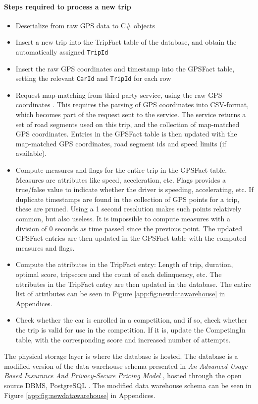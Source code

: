 \paragraph{Steps required to process a new trip}
\begin{itemize}
\item Deserialize from raw GPS data to C\# objects
\item Insert a new trip into the TripFact table of the database, and obtain the automatically assigned \texttt{TripId}
\item Insert the raw GPS coordinates and timestamp into the GPSFact table, setting the relevant \texttt{CarId} and \texttt{TripId} for each row
\item Request map-matching from third party service, using the raw GPS coordinates \cite{trackmatch}. This requires the parsing of GPS coordinates into CSV-format, which becomes part of the request sent to the service. The service returns a set of road segments used on this trip, and the collection of map-matched GPS coordinates. Entries in the GPSFact table is then updated with the map-matched GPS coordinates, road segment ids and speed limits (if available).
\item Compute measures and flags for the entire trip in the GPSFact table. Measures are attributes like speed, acceleration, etc. Flags provides a true/false value to indicate whether the driver is speeding,  accelerating, etc. If duplicate timestamps are found in the collection of GPS points for a trip, these are pruned. Using a 1 second resolution makes such points relatively common, but also useless. It is impossible to compute measures with a division of 0 seconds as time passed since the previous point. The updated GPSFact entries are then updated in the GPSFact table with the computed measures and flags.
\item Compute the attributes in the TripFact entry: Length of trip, duration, optimal score, tripscore and the count of each delinquency, etc. The attributes in the TripFact entry are then updated in the database. The entire list of attributes can be seen in Figure \ref{app:fig:newdatawarehouse} in Appendices.
\item Check whether the car is enrolled in a competition, and if so, check whether the trip is valid for use in the competition. If it is, update the CompetingIn table, with the corresponding score and increased number of attempts. 
\end{itemize}

The physical storage layer is where the database is hosted. The database is a modified version of the data-warehouse schema presented in \textit{An Advanced Usage Based Insurance And Privacy-Secure Pricing Model} \cite{sw9_report}, hosted through the open source DBMS, PostgreSQL \cite{postgresql}. The modified data warehouse schema can be seen in Figure \ref{app:fig:newdatawarehouse} in Appendices.